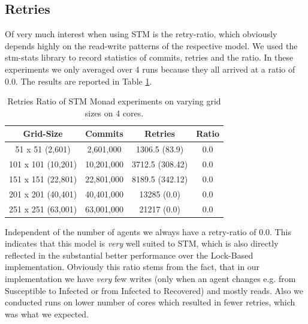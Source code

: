 
\subsection{Retries}
Of very much interest when using STM is the retry-ratio, which obviously depends highly on the read-write patterns of the respective model. We used the stm-stats library to record statistics of commits, retries and the ratio. In these experiments we only averaged over 4 runs because they all arrived at a ratio of 0.0. The results are reported in Table \ref{tab:retries_stm}.

\begin{table}
	\centering
  	\begin{tabular}{ c || c | c | c }
        Grid-Size 		   & Commits    & Retries         & Ratio \\ \hline \hline 
   		51 x 51 (2,601)    & 2,601,000  & 1306.5 (83.9)   & 0.0 \\ \hline
   		101 x 101 (10,201) & 10,201,000 & 3712.5 (308.42) & 0.0 \\ \hline
   		151 x 151 (22,801) & 22,801,000 & 8189.5 (342.12) & 0.0 \\ \hline
   		201 x 201 (40,401) & 40,401,000 & 13285 (0.0)     & 0.0 \\ \hline 
   		251 x 251 (63,001) & 63,001,000 & 21217 (0.0)     & 0.0
  	\end{tabular}
  	
  	\caption{Retries Ratio of STM Monad experiments on varying grid sizes on 4 cores.}
	\label{tab:retries_stm}
\end{table}

Independent of the number of agents we always have a retry-ratio of 0.0. This indicates that this model is \textit{very} well suited to STM, which is also directly reflected in the substantial better performance over the Lock-Based implementation. Obviously this ratio stems from the fact, that in our implementation we have \textit{very} few writes (only when an agent changes e.g. from Susceptible to Infected or from Infected to Recovered) and mostly reads. Also we conducted runs on lower number of cores which resulted in fewer retries, which was what we expected.

